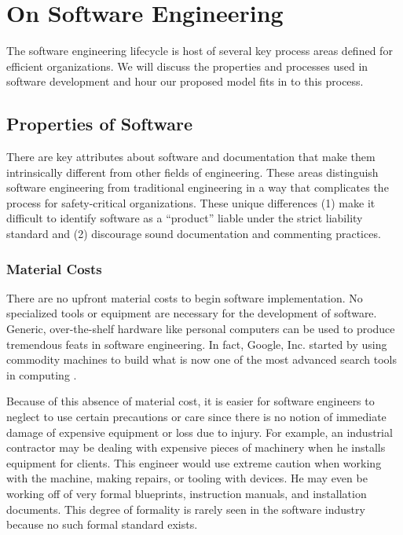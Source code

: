 \section{On Software Engineering}\label{sdp}
The software engineering lifecycle is host of several key process areas defined
for efficient organizations. We will discuss the properties and processes used
in software development and hour our proposed model fits in to this process.

\subsection{Properties of Software}\label{software_props}
There are key attributes about software and documentation that make them 
intrinsically different from other fields of engineering. These areas 
distinguish software engineering from traditional engineering in a way that 
complicates the process for safety-critical organizations. These unique
differences (1) make it difficult to identify software as a ``product'' liable
under the strict liability standard and (2) discourage sound documentation and
commenting practices.

\subsubsection*{Material Costs}

There are no upfront material costs to begin software implementation. No
specialized tools or equipment are necessary for the development of software.
Generic, over-the-shelf hardware like personal computers can be used to produce
tremendous feats in software engineering. In fact, Google, Inc. started by using
commodity machines to build what is now one of the most advanced search tools 
in computing \cite{Google}.

Because of this absence of material cost, it is easier for software engineers to
neglect to use certain precautions or care since there is no notion of immediate
damage of expensive equipment or loss due to injury. For example, an industrial
contractor may be dealing with expensive pieces of machinery when he installs
equipment for clients. This engineer would use extreme caution when working with
the machine, making repairs, or tooling with devices. He may even be working off
of very formal blueprints, instruction manuals, and installation documents. This
degree of formality is rarely seen in the software industry because no such
formal standard exists.

